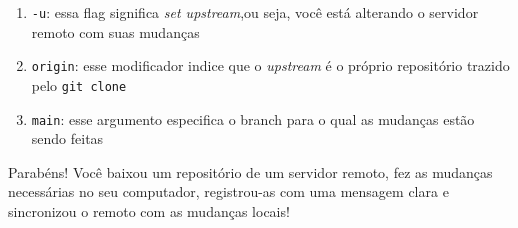 \documentclass{article}
\begin{document}
  \begin{enumerate}
	\item{\texttt{-u}: essa flag significa \textit{set upstream},ou seja, você está alterando o servidor remoto com suas mudanças}
	\item{\texttt{origin}: esse modificador indice que o \textit{upstream} é o próprio repositório trazido pelo \texttt{git clone}}
	\item{\texttt{main}: esse argumento especifica o branch para o qual as mudanças estão sendo feitas}
  \end{enumerate}

  Parabéns! Você baixou um repositório de um servidor remoto, fez as mudanças necessárias no seu computador, registrou-as com uma
  mensagem clara e sincronizou o remoto com as mudanças locais!  
\end{document}
